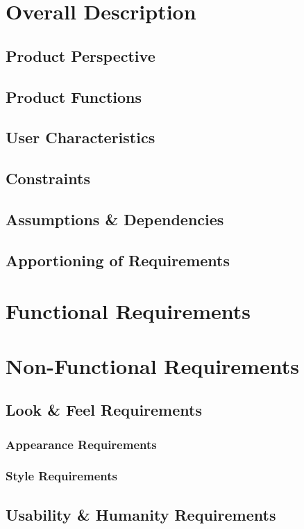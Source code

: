 \documentclass[titlepage]{article}
\begin{document}
\section{Overall Description}
\subsection{Product Perspective}
\subsection{Product Functions}
\subsection{User Characteristics}
\subsection{Constraints}
\subsection{Assumptions \& Dependencies}
\subsection{Apportioning of Requirements}


\section{Functional Requirements}


\section{Non-Functional Requirements}
\subsection{Look \& Feel Requirements}
\subsubsection{Appearance Requirements}
\subsubsection{Style Requirements}

\subsection{Usability \& Humanity Requirements}
\end{document}
